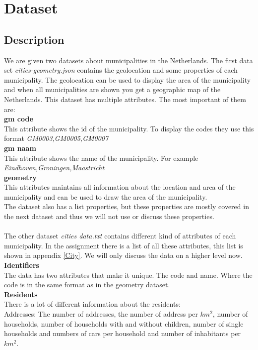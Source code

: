 \section{Dataset}\label{Sec:Dat}
\subsection{Description}
We are given two datasets about municipalities in the Netherlands. The first data set \emph{cities-geometry.json} contains the geolocation and some properties of each municipality. The geolocation can be used to display the area of the municipality and when all municipalities are shown you get a geographic map of the Netherlands. This dataset has multiple attributes. The most important of them are:\\
\textbf{gm code} \\
This attribute shows the id of the municipality. To display the codes they use this format \emph{GM0003,GM0005,GM0007}\\
\textbf{gm naam} \\
This attribute shows the name of the municipality. For example \emph{Eindhoven,Groningen,Maastricht} \\
\textbf{geometry} \\
This attributes maintains all information about the location and area of the municipality and can be used to draw the area of the municipality. \\
The dataset also has a list properties, but these properties are mostly covered in the next dataset and thus we will not use or discuss these properties. \\ \\
 The other dataset \emph{ cities data.txt}  contains different kind of attributes of each municipality. In the assignment there is a list of all these attributes, this list is shown in appendix \ref{City}. We will only discuss the data on a higher level now. \\
 \textbf{Identifiers} \\
 The data has two attributes that make it unique. The code and name. Where the code  is in the same format as in the geometry dataset. \\
  \textbf{Residents} \\
There is a lot of different information about the residents:\\
Addresses: The number of addresses, the number of address per $km^{2}$, number of households, number of households with and without children, number of single households and numbers of cars per household and number of inhabitants per $km^{2}$. \\
